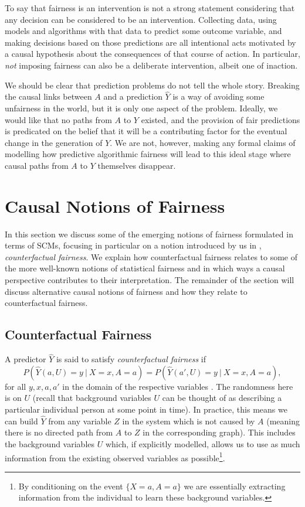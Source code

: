 \documentclass{article}
\begin{document}
To say that fairness is an intervention is not a strong statement considering
that any decision can be considered to be an intervention. Collecting data,
using models and algorithms with that data to predict some outcome variable, and
making decisions based on those predictions are all intentional acts motivated
by a causal hypothesis about the consequences of that course of action. In
particular, \emph{not} imposing fairness can also be a deliberate intervention,
albeit one of inaction.

We should be clear that prediction problems do not tell the whole story. Breaking the causal links between $A$ and a prediction $\hat Y$ is a way of avoiding some unfairness in the world, but it is only one aspect of the problem. Ideally, we would like that no paths from $A$ to $Y$ existed, and the provision of fair predictions is predicated on the belief that it will be a contributing factor for the eventual change in the generation of $Y$. We are not, however, making any formal claims of modelling how predictive algorithmic fairness will lead to this ideal stage where causal paths from $A$ to $Y$ themselves disappear.

\section{Causal Notions of Fairness}
\label{sec:caus-noti-fairn}
In this section we discuss some of the emerging notions of fairness formulated in
terms of SCMs, focusing in particular on a notion introduced by us in
\cite{kusner:17}, \emph{counterfactual fairness}.  We explain how
counterfactual fairness relates to some of the more well-known notions
of statistical fairness and in which ways a causal perspective
contributes to their interpretation.  The remainder of the section
will discuss alternative causal notions of fairness and how
they relate to counterfactual fairness. 

\subsection{Counterfactual Fairness}

A predictor $\hat Y$ is said to satisfy \emph{counterfactual fairness} if
\begin{equation}
  P(\hat Y(a, U) = y\ |\ X = x, A = a) =  P(\hat Y(a', U) = y\ |\ X = x, A = a),
\label{eq:cf}
\end{equation}
\noindent for all $y, x, a, a'$ in the domain of the respective variables
\cite{kusner:17}. The randomness here is on $U$ (recall that background variables $U$ can be thought of as describing a particular individual person at some point in time). In practice, this
means we can build $\hat Y$ from any variable $Z$ in the system which is
not caused by $A$ (meaning there is no directed path from $A$ to $Z$ in the corresponding graph). This includes the background
variables $U$ which, if explicitly modelled, allows us to
use as much information from the existing observed variables as
possible\footnote{By conditioning on the
event $\{X = a, A = a\}$ we are essentially extracting information from the
individual to learn these background variables.}.
\end{document}
